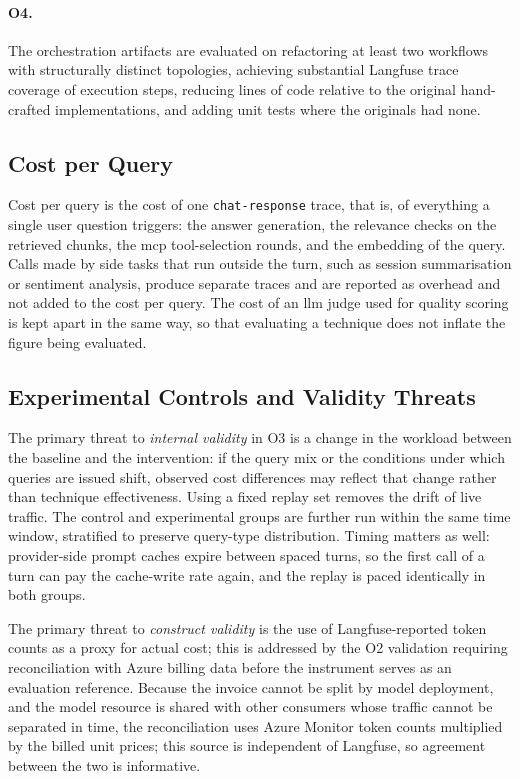 \paragraph{O4.}
The orchestration artifacts are evaluated on refactoring at least two workflows
with structurally distinct topologies, achieving substantial Langfuse trace
coverage of execution steps, reducing lines of code relative to the original
hand-crafted implementations, and adding unit tests where the originals had
none.

\subsection{Cost per Query}
\label{subsec:cost-per-query}

Cost per query is the cost of one \texttt{chat-response} trace, that is, of
everything a single user question triggers: the answer generation, the
relevance checks on the retrieved chunks, the \gls{mcp} tool-selection
rounds, and the embedding of the query.
Calls made by side tasks that run outside the turn, such as session
summarisation or sentiment analysis, produce separate traces and are reported as
overhead and not added to the cost per query.
The cost of an \gls{llm} judge used for quality scoring is kept apart in the
same way, so that evaluating a technique does not inflate the figure being
evaluated.

\subsection{Experimental Controls and Validity Threats}
\label{subsec:validity}

The primary threat to \textit{internal validity} in O3 is a change in the
workload between the baseline and the intervention: if the query mix or the
conditions under which queries are issued shift, observed cost differences may
reflect that change rather than technique effectiveness.
Using a fixed replay set removes the drift of live traffic.
The control and experimental groups are further run within the same time
window, stratified to preserve query-type distribution.
Timing matters as well: provider-side prompt caches expire between spaced
turns, so the first call of a turn can pay the cache-write rate again, and
the replay is paced identically in both groups.

The primary threat to \textit{construct validity} is the use of
Langfuse-reported token counts as a proxy for actual cost; this is addressed by
the O2 validation requiring reconciliation with Azure billing data before the
instrument serves as an evaluation reference.
Because the invoice cannot be split by model deployment, and the model resource
is shared with other consumers whose traffic cannot be separated in time, the
reconciliation uses Azure Monitor token counts multiplied by the billed unit
prices; this source is independent of Langfuse, so agreement between the two is
informative.

